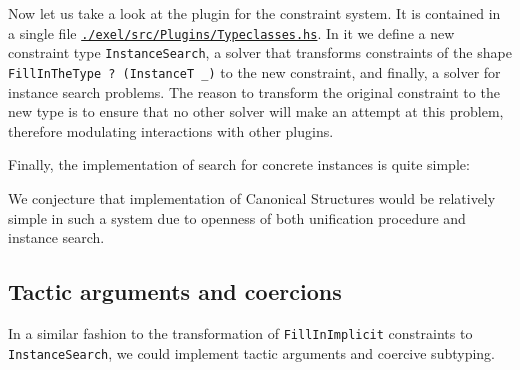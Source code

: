 \documentclass[
  sigconf,
  screen,
  review]{acmart}
\newenvironment{Shaded}{}{}
\newcommand{\DataTypeTok}[1]{\textcolor[rgb]{0.56,0.13,0.00}{#1}}
\newcommand{\FunctionTok}[1]{\textcolor[rgb]{0.02,0.16,0.49}{#1}}
\newcommand{\KeywordTok}[1]{\textcolor[rgb]{0.00,0.44,0.13}{\textbf{#1}}}
\newcommand{\NormalTok}[1]{#1}
\newcommand{\OperatorTok}[1]{\textcolor[rgb]{0.40,0.40,0.40}{#1}}
\newcommand{\OtherTok}[1]{\textcolor[rgb]{0.00,0.44,0.13}{#1}}
\begin{document}
Now let us take a look at the plugin for the constraint system. It is
contained in a single file
\href{https://github.com/liesnikov/extensible-elaborator/blob/elaborator-experiments/exel/src/Plugins/Typeclasses.hs}{\texttt{./exel/src/Plugins/Typeclasses.hs}}.
In it we define a new constraint type \texttt{InstanceSearch}, a solver
that transforms constraints of the shape
\texttt{FillInTheType\ ?\ (InstanceT\ \_)} to the new constraint, and
finally, a solver for instance search problems. The reason to transform
the original constraint to the new type is to ensure that no other
solver will make an attempt at this problem, therefore modulating
interactions with other plugins.

Finally, the implementation of search for concrete instances is quite
simple:

\begin{Shaded}
\end{Shaded}

We conjecture that implementation of Canonical Structures
\citep{mahboubiCanonicalStructuresWorking2013} would be relatively
simple in such a system due to openness of both unification procedure
and instance search.

\hypertarget{sec:coercion-tactics}{%
\subsection{Tactic arguments and coercions}\label{sec:coercion-tactics}}

In a similar fashion to the transformation of \texttt{FillInImplicit}
constraints to \texttt{InstanceSearch}, we could implement tactic
arguments and coercive subtyping.
\end{document}
